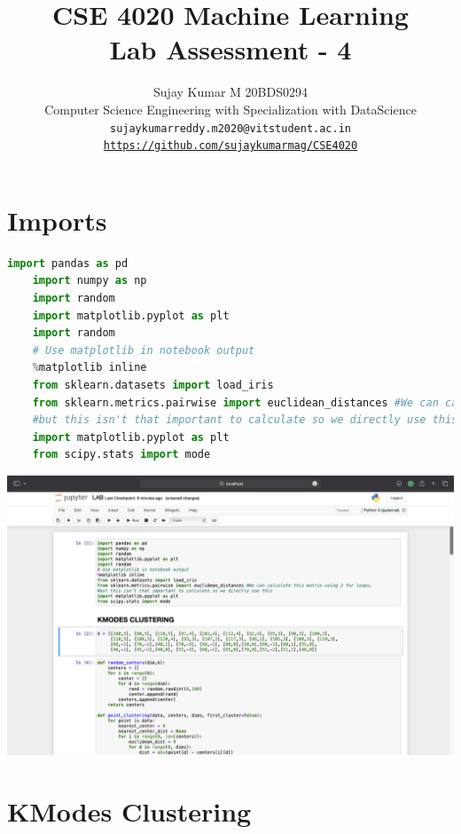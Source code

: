 \documentclass{article}
\title{CSE 4020 Machine Learning \\ Lab Assessment - 4  }
\author{Sujay Kumar M 20BDS0294\\ \small Computer Science Engineering with Specialization with DataScience\\ \tt sujaykumarreddy.m2020@vitstudent.ac.in
	\\ \url{https://github.com/sujaykumarmag/CSE4020}}
\begin{document}
\maketitle
\section{Imports}
\begin{lstlisting}[language=Python]
	import pandas as pd
	import numpy as np
	import random
	import matplotlib.pyplot as plt
	import random
	# Use matplotlib in notebook output
	%matplotlib inline
	from sklearn.datasets import load_iris
	from sklearn.metrics.pairwise import euclidean_distances #We can calculate this matrix using 2 for loops, 
	#but this isn't that important to calculate so we directly use this
	import matplotlib.pyplot as plt
	from scipy.stats import mode
\end{lstlisting}
\includegraphics[scale=0.3]{images/1.png}
\section{KModes Clustering}
\end{document}
